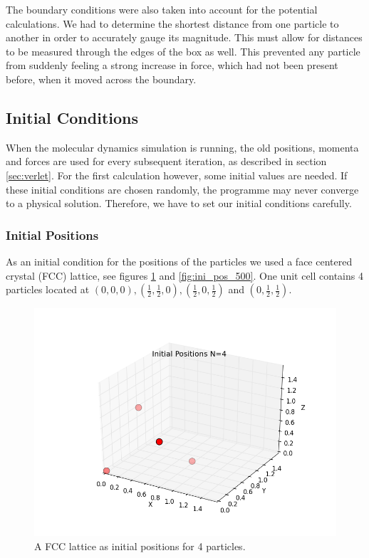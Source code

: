 \documentclass[a4paper,twoside,12pt]{article}
\begin{document}
\noindent The boundary conditions were also taken into account for the potential calculations. We had to determine the shortest distance from one particle to another in order to accurately gauge its magnitude. This must allow for distances to be measured through the edges of the box as well. This prevented any particle from suddenly feeling a strong increase in force, which had not been present before, when it moved across the boundary.

\subsection{Initial Conditions}\label{sec:ini}

\noindent When the molecular dynamics simulation is running, the old positions, momenta and forces are used for every subsequent iteration, as described in section \ref{sec:verlet}. For the first calculation however, some initial values are needed. If these initial conditions are chosen randomly, the programme may never converge to a physical solution. Therefore, we have to set our initial conditions carefully.

\subsubsection{Initial Positions}

\noindent As an initial condition for the positions of the particles we used a face centered crystal (FCC) lattice, see figures \ref{fig:ini_pos_4} and \ref{fig:ini_pos_500}. One unit cell contains 4 particles located at $(0,0,0), (\frac{1}{2},\frac{1}{2},0), (\frac{1}{2},0,\frac{1}{2})$ and $(0,\frac{1}{2},\frac{1}{2})$.

\begin{figure}[h]
\centering
\includegraphics[scale=0.4]{figures/initial_positions_4.png}
\caption{A FCC lattice as initial positions for 4 particles.}
\label{fig:ini_pos_4}
\end{figure} 
\end{document}
